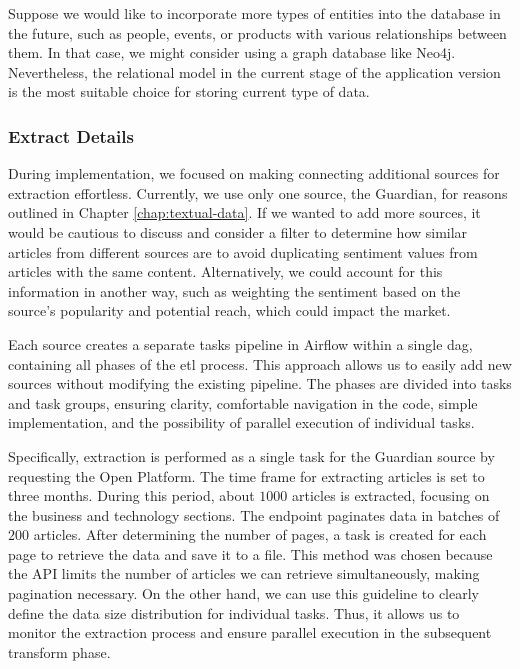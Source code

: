 Suppose we would like to incorporate more types of entities into the database in the future, such as people, events, or products with various relationships between them. In that case, we might consider using a graph database like Neo4j. Nevertheless, the relational model in the current stage of the application version is the most suitable choice for storing current type of data.

\subsubsection{Extract Details}
\label{subsubsec:architecture-etl-extract-details}
During implementation, we focused on making connecting additional sources for extraction effortless. Currently, we use only one source, the Guardian, for reasons outlined in Chapter \ref{chap:textual-data}. If we wanted to add more sources, it would be cautious to discuss and consider a filter to determine how similar articles from different sources are to avoid duplicating sentiment values from articles with the same content. Alternatively, we could account for this information in another way, such as weighting the sentiment based on the source's popularity and potential reach, which could impact the market.

Each source creates a separate tasks pipeline in Airflow within a single \acrshort{dag}, containing all phases of the \acrshort{etl} process. This approach allows us to easily add new sources without modifying the existing pipeline. The phases are divided into tasks and task groups, ensuring clarity, comfortable navigation in the code, simple implementation, and the possibility of parallel execution of individual tasks.

Specifically, extraction is performed as a single task for the Guardian source by requesting the Open Platform. The time frame for extracting articles is set to three months. During this period, about $1000$ articles is extracted, focusing on the business and technology sections. The endpoint paginates data in batches of $200$ articles. After determining the number of pages, a task is created for each page to retrieve the data and save it to a file. This method was chosen because the API limits the number of articles we can retrieve simultaneously, making pagination necessary. On the other hand, we can use this guideline to clearly define the data size distribution for individual tasks. Thus, it allows us to monitor the extraction process and ensure parallel execution in the subsequent transform phase.

